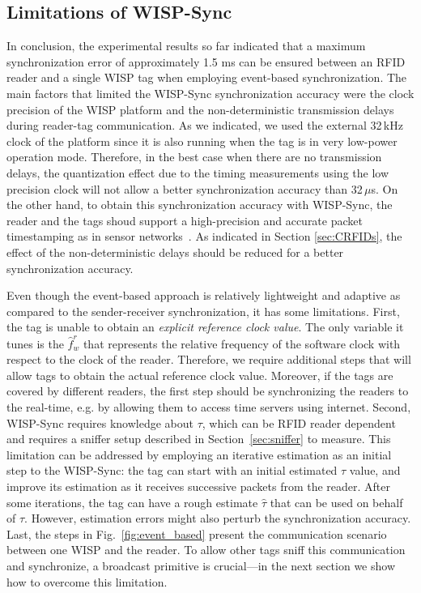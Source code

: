 \documentclass[10pt,journal,compsoc]{IEEEtran}
\begin{document}
\subsection{Limitations of WISP-Sync}

In conclusion, the experimental results so far indicated that a maximum synchronization error of approximately 1.5 ms can be ensured between an RFID reader and a single WISP tag when employing event-based synchronization. The main factors that limited the WISP-Sync synchronization accuracy were the clock precision of the WISP platform and the non-deterministic transmission delays during reader-tag communication. As we indicated, we used the external 32\,kHz clock of the platform since it is also running when the tag is in very low-power operation mode. Therefore, in the best case when there are no transmission delays, the quantization effect due to the timing measurements using the low precision clock will not allow a better synchronization accuracy than 32\,$\mu$s. On the other hand, to obtain this synchronization accuracy with WISP-Sync, the reader and the tags shoud support a high-precision and accurate packet timestamping as in sensor networks~\cite{Maroti2004}. As indicated in Section \ref{sec:CRFIDs}, the effect of the non-deterministic delays should be reduced for a better synchronization accuracy.

Even though the event-based approach is relatively lightweight and adaptive as compared to the sender-receiver synchronization, it has some limitations. First, the tag is unable to obtain an \emph{explicit reference clock value}. The only variable it tunes is the $\hat{f}_w^r$ that represents the relative frequency of the software clock with respect to the clock of the reader. Therefore, we require additional steps that will allow tags to obtain the actual reference clock value. Moreover, if the tags are covered by different readers, the first step should be synchronizing the readers to the real-time, e.g. by allowing them to access time servers using internet.
Second, WISP-Sync requires knowledge about $\tau$, which can be RFID reader dependent and requires a sniffer setup described in Section~\ref{sec:sniffer} to measure. This limitation can be addressed by employing an iterative estimation as an initial step to the WISP-Sync: the tag can start with an initial estimated $\tau$ value, and improve its estimation as it receives successive packets from the reader. After some iterations, the tag can have a rough estimate $\hat{\tau}$ that can be used on behalf of $\tau$. However, estimation errors might also perturb the synchronization accuracy. Last, the steps in Fig.~\ref{fig:event_based} present the communication scenario between one WISP and the reader. To allow other tags sniff this communication and synchronize, a broadcast primitive is crucial---in the next section we show how to overcome this limitation.
\end{document}
